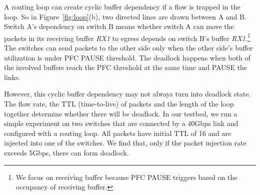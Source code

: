 
A routing loop can create cyclic buffer dependency if a flow is trapped in the loop.
 So in Figure~\ref{fig:loop}(b), two directed lines are drawn between A and B.
Switch A's dependency on switch B means whether switch A can move
the packets in its receiving buffer {\em RX1} to egress depends on switch B's buffer {\em RX1}.\footnote{We
focus on receiving buffer because PFC PAUSE triggers based on the occupancy of receiving buffer.}
The switches can send packets to the other side only
when the other side's buffer utilization is under PFC PAUSE threshold. The deadlock happens when
both of the involved buffers reach the PFC threshold at the same time and PAUSE the links.


However, this cyclic buffer dependency may not always turn into deadlock state. The flow
 rate, the TTL (time-to-live) of packets and the length of the loop together
determine whether there will be deadlock. In our testbed, we run a simple experiment on
two switches that are connected by a 40Gbps link and configured with a routing loop.
All packets have initial TTL of 16 and are injected into one of the switches. We find that,
only if the packet injection rate exceeds 5Gbps, there can form deadlock.

